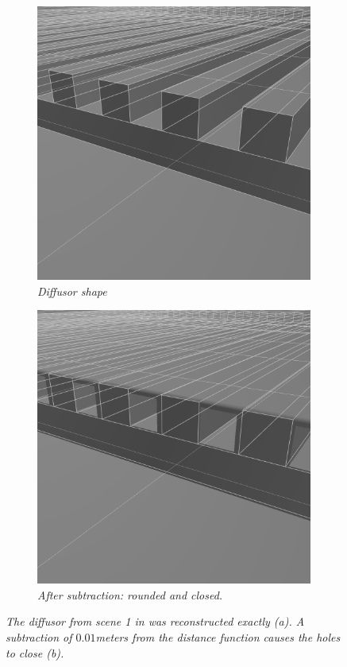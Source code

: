 \documentclass[twoside,a4paper]{article}
\begin{document}
\begin{figure}[ht]
\centering
\begin{subfigure}[t]{0.2\textwidth}
  \centering
  \includegraphics[width=0.9\linewidth]{img/diffusorNorm.png}
  \caption{\it Diffusor shape}
  \label{fig:diffNorm}
\end{subfigure}%
\begin{subfigure}[t]{0.2\textwidth}
  \centering
  \includegraphics[width=0.9\linewidth]{img/diffusorSmooth.png}
  \caption{\it After subtraction: rounded and closed.}
  \label{fig:sub2}
\end{subfigure}
\caption{\it The diffusor from scene 1 in \cite{brinkmann_round_2019} was reconstructed exactly (a). A subtraction of $0.01$meters from the distance function causes the holes to close (b).}
\label{fig:diffSmooth}
\end{figure}
\end{document}
